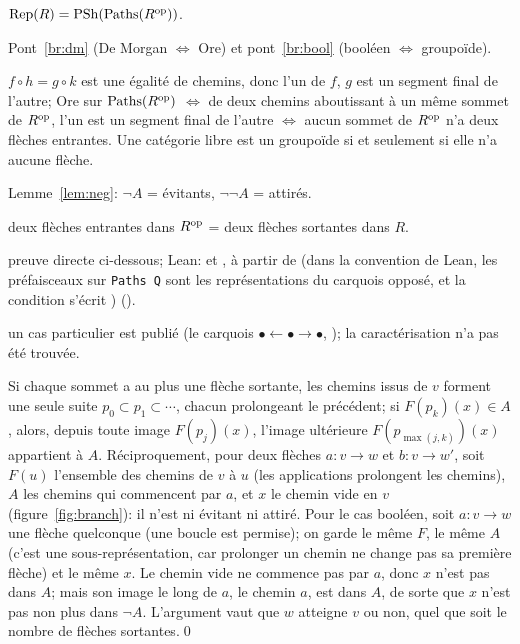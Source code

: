 \begin{trace}
\item[tablier] $\mathrm{Rep}(R) = \mathrm{PSh}(\mathrm{Paths}(R^{\mathrm{op}}))$.
\item[arche] Pont~\ref{br:dm} (De Morgan $\iff$ Ore) et pont~\ref{br:bool} (booléen $\iff$ groupoïde).
\item[spécialiser] $f\circ h = g\circ k$ est une égalité de chemins, donc l'un de $f$, $g$ est un segment final de l'autre; Ore sur $\mathrm{Paths}(R^{\mathrm{op}})$ $\iff$ de deux chemins aboutissant à un même sommet de $R^{\mathrm{op}}$, l'un est un segment final de l'autre $\iff$ aucun sommet de $R^{\mathrm{op}}$ n'a deux flèches entrantes. Une catégorie libre est un groupoïde si et seulement si elle n'a aucune flèche.
\item[déplier] Lemme~\ref{lem:neg}: $\neg A$ = évitants, $\neg\neg A$ = attirés.
\item[réécrire] deux flèches entrantes dans $R^{\mathrm{op}}$ = deux flèches sortantes dans $R$.
\item[vérifier] preuve directe ci-dessous; Lean:  et , à partir de  (dans la convention de Lean, les préfaisceaux sur \texttt{Paths Q} sont les représentations du carquois opposé, et la condition s'écrit ) ().
\item[nouveauté] un cas particulier est publié (le carquois $\bullet\leftarrow\bullet\to\bullet$, \cite[\S4.1.4]{caramello-chamoun}); la caractérisation n'a pas été trouvée.
\end{trace}

\direct{} Si chaque sommet a au plus une flèche sortante, les chemins issus de $v$ forment une seule suite $p_0\subset p_1\subset\cdots$, chacun prolongeant le précédent; si $F(p_k)(x)\in A$, alors, depuis toute image $F(p_j)(x)$, l'image ultérieure $F(p_{\max(j,k)})(x)$ appartient à $A$. Réciproquement, pour deux flèches $a : v\to w$ et $b : v\to w'$, soit $F(u)$ l'ensemble des chemins de $v$ à $u$ (les applications prolongent les chemins), $A$ les chemins qui commencent par $a$, et $x$ le chemin vide en $v$ (figure~\ref{fig:branch}): il n'est ni évitant ni attiré. Pour le cas booléen, soit $a : v\to w$ une flèche quelconque (une boucle est permise); on garde le même $F$, le même $A$ (c'est une sous-représentation, car prolonger un chemin ne change pas sa première flèche) et le même $x$. Le chemin vide ne commence pas par $a$, donc $x$ n'est pas dans $A$; mais son image le long de $a$, le chemin $a$, est dans $A$, de sorte que $x$ n'est pas non plus dans $\neg A$. L'argument vaut que $w$ atteigne $v$ ou non, quel que soit le nombre de flèches sortantes.\qed

